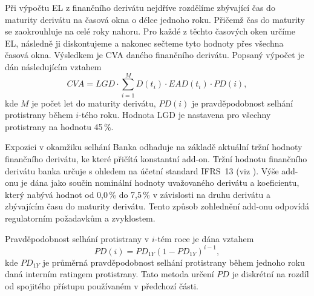 \documentclass[a4paper,12pt]{report}
\theoremstyle{definition} \newtheorem{definice}[veta]{Definice}
\theoremstyle{remark}
\begin{document}
Při výpočtu EL z finančního derivátu nejdříve rozdělíme zbývající čas do maturity derivátu na časová okna o délce jednoho roku. 
Přičemž čas do maturity se zaokrouhluje na celé roky nahoru.
Pro každé z těchto časových oken určíme EL, následně ji diskontujeme a nakonec sečteme tyto hodnoty přes všechna časová okna.
Výsledkem je CVA daného finančního derivátu.
Popsaný výpočet je dán následujícím vztahem
\begin{equation}\label{CVA_banka}
CV\!A=LGD\cdot\sum_{i=1}^M D(t_i)\cdot EAD(t_i)\cdot PD(i),
\end{equation}
kde $M$ je počet let do maturity derivátu, $PD(i)$ je pravděpodobnost selhání protistrany během $i$-tého roku.
Hodnota LGD je nastavena pro všechny protistrany na hodnotu 45\,\%.


Expozici v okamžiku selhání Banka odhaduje na základě aktuální tržní hodnoty finančního derivátu, ke které přičítá konstantní add-on.
Tržní hodnotu finančního derivátu banka určuje s ohledem na účetní standard IFRS~13 (viz \cite{ifrs13}). 
Výše add-onu je dána jako součin nominální hodnoty uvažovaného derivátu a koeficientu, který nabývá hodnot od 0,0\,\% do 7,5\,\% v závislosti na druhu derivátu a zbývajícím času do maturity derivátu. 
Tento způsob zohlednění add-onu odpovídá regulatorním požadavkům a zvyklostem.

Pravděpodobnost selhání protistrany v $i$-tém roce je dána vztahem 
\begin{equation}\label{PD_banka}
PD(i)=PD_{1Y}(1-PD_{1Y})^{i-1},
\end{equation}
kde $PD_{1Y}$ je průměrná pravděpodobnost selhání protistrany během jednoho roku daná interním ratingem protistrany. 
Tato metoda určení $PD$ je diskrétní na rozdíl od spojitého přístupu používaném v předchozí části. 
\end{document}
